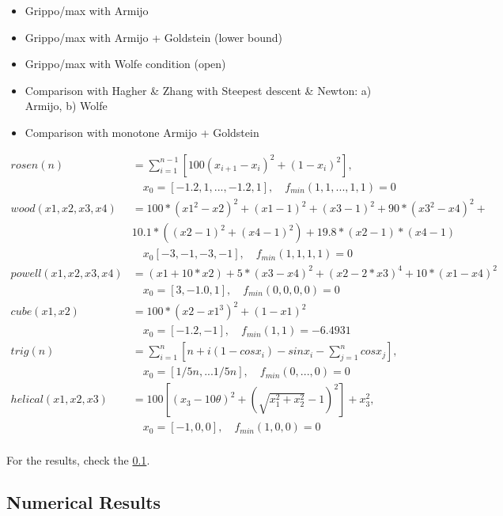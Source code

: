 \documentclass[a4paper,11pt]{article}
\numberwithin{equation}{section} %
\begin{document}
\begin{itemize}
    \item Grippo/max with Armijo
    \item Grippo/max with Armijo + Goldstein (lower bound)
    \item Grippo/max with Wolfe condition (open)
    \item Comparison with Hagher \& Zhang with Steepest descent \& Newton: a) Armijo, b) Wolfe
    \item Comparison with monotone Armijo + Goldstein
\end{itemize}

\begin{align*}
    rosen(n) &= \sum_{i=1}^{n-1} [100 (x_{i+1}-x_i)^2 + (1-x_i)^2], \\ &\quad x_0 = [-1.2,1,...,-1.2,1], \quad f_{min}(1,1,...,1,1)=0  \\
    wood(x1,x2,x3,x4) &= 100*(x1^2-x2)^2 + (x1-1)^2 + (x3-1)^2 + 90*(x3^2 - x4)^2 + \\ & 10.1*((x2-1)^2 + (x4-1)^2) + 19.8*(x2-1)*(x4-1)\\ & \quad x_0 [-3,-1,-3,-1], \quad f_{min}(1,1,1,1) = 0 \\
    powell(x1,x2,x3,x4) &= (x1+10*x2) + 5*(x3-x4)^2 + (x2-2*x3)^4 + 10*(x1-x4)^2 \\ & \quad x_0 = [3,-1.0,1], \quad f_{min}(0,0,0,0) = 0 \\
    cube(x1,x2) &= 100*(x2-x1^3)^2 + (1-x1)^2 \\ & \quad x_0 = [-1.2,-1], \quad f_{min}(1,1) = -6.4931 \\ 
    trig(n) &= \sum_{i=1}^{n}[n + i(1-cosx_i) - sinx_i - \sum_{j=1}^{n}cosx_j],\\ & \quad x_0 = [1/5n,...1/5n], \quad f_{min}(0,...,0) = 0 \\
    helical(x1,x2,x3) &= 100[(x_3-10\theta)^2 + (\sqrt{x_1^2+x_2^2}-1)^2] + x_3^2, \\ & \quad x_0 = [-1,0,0], \quad f_{min}(1,0,0) = 0 \\
\end{align*}

For the results, check the \ref{simulation2}.

\subsection{Numerical Results}
\label{simulation2}
\end{document}
